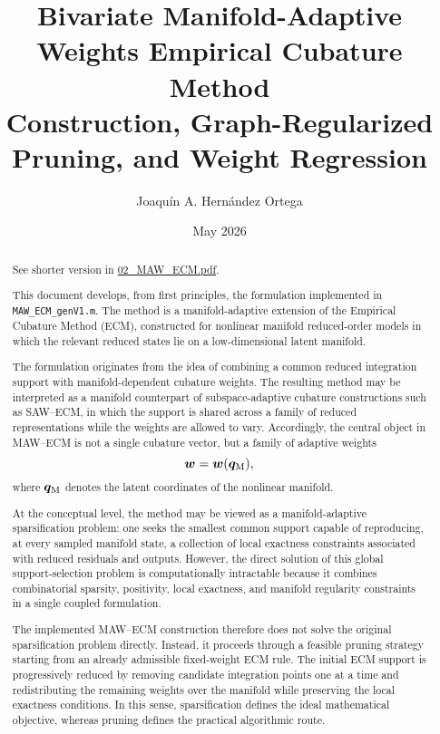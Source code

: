 \documentclass[11pt,a4paper]{article}
\title{
Bivariate Manifold-Adaptive Weights Empirical Cubature Method\\
\large Construction, Graph-Regularized Pruning, and Weight Regression
}
\author{Joaqu\'in A. Hern\'andez Ortega}
\date{May 2026}
\begin{document}
\maketitle

\begin{abstract}

See shorter version in \href{/home/joaquin/Desktop/CURRENT_TASKS/MATLAB_CODES/TESTING_PROBLEMS_FEHROM/115_PAPER_MAW_ECM/LATEX/02_MAW_ECM.pdf}{02\_MAW\_ECM.pdf}.


This document develops, from first principles, the formulation implemented in
\texttt{MAW\_ECM\_genV1.m}. The method is a manifold-adaptive extension of the
Empirical Cubature Method (ECM), constructed for nonlinear manifold reduced-order
models in which the relevant reduced states lie on a low-dimensional latent
manifold.

The formulation originates from the idea of combining a common reduced
integration support with manifold-dependent cubature weights. The resulting
method may be interpreted as a manifold counterpart of subspace-adaptive
cubature constructions such as SAW--ECM, in which the support is shared across a
family of reduced representations while the weights are allowed to vary.
Accordingly, the central object in MAW--ECM is not a single cubature vector, but
a family of adaptive weights
\[
        \bm w=\bm w(\bm q_{\mathrm{M}}),
\]
where $\bm q_{\mathrm{M}}$ denotes the latent coordinates of the nonlinear manifold.

At the conceptual level, the method may be viewed as a manifold-adaptive
sparsification problem: one seeks the smallest common support capable of
reproducing, at every sampled manifold state, a collection of local exactness
constraints associated with reduced residuals and outputs. However, the direct
solution of this global support-selection problem is computationally intractable
because it combines combinatorial sparsity, positivity, local exactness, and
manifold regularity constraints in a single coupled formulation.

The implemented MAW--ECM construction therefore does not solve the original
sparsification problem directly. Instead, it proceeds through a feasible pruning
strategy starting from an already admissible fixed-weight ECM rule. The initial
ECM support is progressively reduced by removing candidate integration points
one at a time and redistributing the remaining weights over the manifold while
preserving the local exactness conditions. In this sense, sparsification defines
the ideal mathematical objective, whereas pruning defines the practical
algorithmic route.


\end{abstract}
\end{document}
